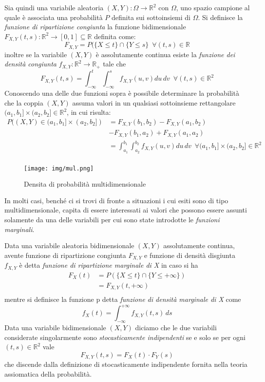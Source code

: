 \documentclass[a4paper,12pt, oneside]{book}
\newcommand{\numberset}{\mathbb}
\newcommand{\R}{\numberset{R}}
\begin{document}
Sia quindi una variabile aleatoria $(X, Y): \Omega \to \R ^ 2$ con $\Omega$, uno spazio campione 
al quale è associata una probabilità $P$ definita sui sottoinsiemi di $\Omega$.\newline
Si definisce la \emph{funzione di ripartizione congiunta} la funzione bidimensionale 
$F_{X, Y}(t, s):\R ^2 \to [0,1] \subseteq \R$ definita come:
\[F_{X, Y} = P(\{X \leq t\} \cap \{Y \leq s\}\,\,\,\forall (t,s)\in \R\]
inoltre se la variabile $(X,Y)$ è assolutamente continua esiste la \emph{funzione dei densità congiunta}
$f_{X, Y}:\R ^2 \to \R_+$ tale che
\[F_{X, Y}(t, s) = \int_{-\infty}^t \int_{-\infty}^s f_{X, Y}(u, v)du\,dv\,\,\,\forall (t, s)\in \R ^2\]
Conoscendo una delle due funzioni sopra è possibile determinare la probabilità che la coppia $(X,Y)$ assuma
valori in un qualsiasi sottoinsieme rettangolare $(a_1, b_1] \times (a_2, b_2] \in \R^2$, in cui risulta:
\[ \begin{split}
    P((X, Y) \in (a_1, b_1] \times (a_2, b_2]) & = F_{X, Y} (b_1, b_2) - F_{X, Y}(a_1, b_2)\\ 
                                               & - F_{X, Y} (b_1, a_2) + F_{X, Y}(a_1, a_2) \\
    & = \int_{a_1}^{b_1} \int_{a_2}^{b_2} f_{X, Y}(u, v) du\,dv\,\,\, \forall (a_1, b_1] \times(a_2, b_2] \in \R^2\\
   \end{split}\]

\begin{figure}
    \caption{Densita di probabilità multidimensionale}
    \label{img:densitaMulti}
    \texttt{[image: img/mul.png]}
\end{figure}
In molti casi, benché ci si trovi di fronte a situazioni i cui esiti sono di tipo multidimensionale, 
capita di essere interessati ai valori che possono essere assunti solamente da una delle variabili per cui 
sono state introdotte le \emph{funzioni marginali}.

Data una variabile aleatoria bidimensionale $(X, Y)$ assolutamente continua, avente 
funzione di ripartizione congiunta $F_{X, Y}$ e funzione di densità disgiunta $f_{X, Y}$ è detta 
\emph{funzione di ripartizione marginale di X} in caso si ha
\[ \begin{split}
    F_X(t) & = P(\{X \leq t\} \cap \{Y \leq +\infty\})\\
           & = F_{X, Y}(t, +\infty)\\
   \end{split}\]
mentre si definisce la funzione p detta \emph{funzione di densità marginale di X} come
\[f_X(t) = \int_{-\infty}^{+\infty} f_{X, Y}(t, s)\,ds\]
Data una variabile bidimensionale $(X, Y)$ diciamo che le due variabili considerate singolarmente 
sono \emph{stocasticamente indipendenti} se e solo se per ogni $(t, s) \in \R^2$ vale
\[F_{X, Y}(t, s) = F_X(t) \cdot F_Y(s)\]
che discende dalla definizione di stocasticamente indipendente fornita nella teoria assiomatica della probabilità.
\end{document}

